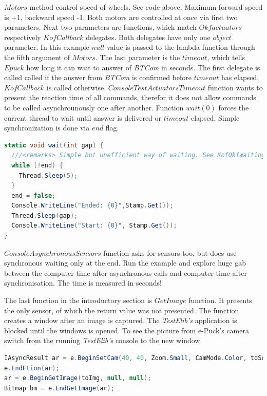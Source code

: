   $Motors$ method control speed of wheels. See code above. Maximum forward speed is +1, backward speed -1. 
  Both motors are controlled at once via first two parameters.
  Next two parameters are functions, which match $Okfactuators$ respectively $KofCallback$ delegates. 
  Both delegates have only one $object$ parameter. In this example $null$ value is passed
  to the lambda function through the fifth argument of $Motors$. The last parameter is the $timeout$, 
  which tells $Epuck$ how long it can wait to answer of {\it BTCom} in seconds.
  The first delegate is called called if the answer from {\it BTCom} is confirmed before $timeout$ has elapsed. 
  $KofCallback$ is called otherwise.
  $ConsoleTestActuatorsTimeout$ function wants to present the reaction time of all commands, 
  therefor it does not allow commands to be called asynchrounously one after another.
  Function $wait(0)$ forces the current thread to wait until answer is delivered
  or $timeout$ elapsed. Simple synchronization is done via $end$ flag.
\begin{lstlisting}[language=cs]
static void wait(int gap) {
  ///<remarks> Simple but unefficient way of waiting. See KofOkfWaiting(..) in Behaviour for usage of EventWaitHandle.</remarks>
  while (!end) { 
    Thread.Sleep(5); 
  } 
  end = false; 
  Console.WriteLine("Ended: {0}",Stamp.Get());
  Thread.Sleep(gap);
  Console.WriteLine("Start: {0}", Stamp.Get());
}
\end{lstlisting}

  $ConsoleAsynchronousSensors$ function asks for sensors too, but does use synchronous waiting only at the end. Run the example and explore huge gab
  between the computer time after asynchronous calls and computer time after synchronisation. 
  The time is measured in seconds!
  
  The last function in the introductory section is $GetImage$ function. 
  It presents the only sensor, of which the return value was not presented.
  The function creates a window after an image is captured. 
  The {\it TestElib's} application is blocked until the windows is opened. To see the picture from
  e-Puck's camera switch from the running {\it TestElib's} console to the new window.


\begin{lstlisting}[language=cs]
IAsyncResult ar = e.BeginSetCam(40, 40, Zoom.Small, CamMode.Color, toSetCam, null, null);
e.EndFtion(ar);
ar = e.BeginGetImage(toImg, null, null);
Bitmap bm = e.EndGetImage(ar);	
\end{lstlisting}


